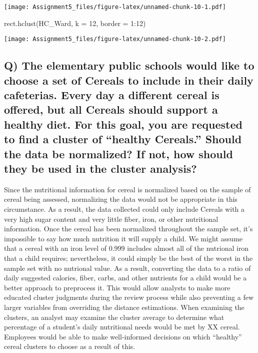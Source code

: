 \documentclass[
]{article}
\newenvironment{Shaded}{\begin{snugshade}}{\end{snugshade}}
\newcommand{\AttributeTok}[1]{\textcolor[rgb]{0.77,0.63,0.00}{#1}}
\newcommand{\DecValTok}[1]{\textcolor[rgb]{0.00,0.00,0.81}{#1}}
\newcommand{\FunctionTok}[1]{\textcolor[rgb]{0.00,0.00,0.00}{#1}}
\newcommand{\NormalTok}[1]{#1}
\newcommand{\SpecialCharTok}[1]{\textcolor[rgb]{0.00,0.00,0.00}{#1}}
\begin{document}
\texttt{[image: Assignment5\_files/figure-latex/unnamed-chunk-10-1.pdf]}

\begin{Shaded}
\begin{Highlighting}[]
\FunctionTok{rect.hclust}\NormalTok{(HC\_Ward, }\AttributeTok{k =} \DecValTok{12}\NormalTok{, }\AttributeTok{border =} \DecValTok{1}\SpecialCharTok{:}\DecValTok{12}\NormalTok{)}
\end{Highlighting}
\end{Shaded}

\texttt{[image: Assignment5\_files/figure-latex/unnamed-chunk-10-2.pdf]}

\hypertarget{q-the-elementary-public-schools-would-like-to-choose-a-set-of-cereals-to-include-in-their-daily-cafeterias.-every-day-a-different-cereal-is-offered-but-all-cereals-should-support-a-healthy-diet.-for-this-goal-you-are-requested-to-find-a-cluster-of-healthy-cereals.-should-the-data-be-normalized-if-not-how-should-they-be-used-in-the-cluster-analysis}{%
\subsection{Q) The elementary public schools would like to choose a set
of Cereals to include in their daily cafeterias. Every day a different
cereal is offered, but all Cereals should support a healthy diet. For
this goal, you are requested to find a cluster of ``healthy Cereals.''
Should the data be normalized? If not, how should they be used in the
cluster
analysis?}\label{q-the-elementary-public-schools-would-like-to-choose-a-set-of-cereals-to-include-in-their-daily-cafeterias.-every-day-a-different-cereal-is-offered-but-all-cereals-should-support-a-healthy-diet.-for-this-goal-you-are-requested-to-find-a-cluster-of-healthy-cereals.-should-the-data-be-normalized-if-not-how-should-they-be-used-in-the-cluster-analysis}}

Since the nutritional information for cereal is normalized based on the
sample of cereal being assessed, normalizing the data would not be
appropriate in this circumstance. As a result, the data collected could
only include Cereals with a very high sugar content and very little
fiber, iron, or other nutritional information. Once the cereal has been
normalized throughout the sample set, it's impossible to say how much
nutrition it will supply a child. We might assume that a cereal with an
iron level of 0.999 includes almost all of the nutrional iron that a
child requires; nevertheless, it could simply be the best of the worst
in the sample set with no nutrional value. As a result, converting the
data to a ratio of daily suggested calories, fiber, carbs, and other
nutrients for a child would be a better approach to preprocess it. This
would allow analysts to make more educated cluster judgments during the
review process while also preventing a few larger variables from
overriding the distance estimations. When examining the clusters, an
analyst may examine the cluster average to determine what percentage of
a student's daily nutritional needs would be met by XX cereal. Employees
would be able to make well-informed decisions on which ``healthy''
cereal clusters to choose as a result of this.
\end{document}
